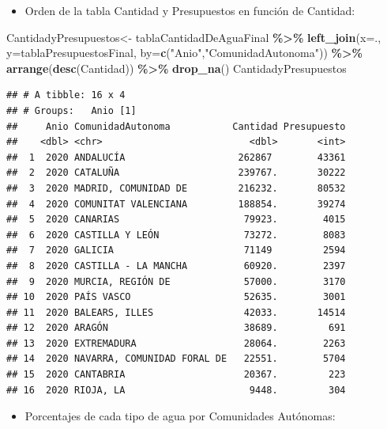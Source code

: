 \documentclass[
]{article}
\newenvironment{Shaded}{\begin{snugshade}}{\end{snugshade}}
\newcommand{\AttributeTok}[1]{\textcolor[rgb]{0.13,0.29,0.53}{#1}}
\newcommand{\FunctionTok}[1]{\textcolor[rgb]{0.13,0.29,0.53}{\textbf{#1}}}
\newcommand{\NormalTok}[1]{#1}
\newcommand{\OtherTok}[1]{\textcolor[rgb]{0.56,0.35,0.01}{#1}}
\newcommand{\SpecialCharTok}[1]{\textcolor[rgb]{0.81,0.36,0.00}{\textbf{#1}}}
\newcommand{\StringTok}[1]{\textcolor[rgb]{0.31,0.60,0.02}{#1}}
\providecommand{\tightlist}{%
  \setlength{\itemsep}{0pt}\setlength{\parskip}{0pt}}
\begin{document}
\hypertarget{CantidadPresupuesto}{}

\begin{itemize}
\tightlist
\item
  Orden de la tabla Cantidad y Presupuestos en función de Cantidad:
\end{itemize}

\begin{Shaded}
\begin{Highlighting}[]
\NormalTok{CantidadyPresupuestos}\OtherTok{\textless{}{-}}\NormalTok{ tablaCantidadDeAguaFinal }\SpecialCharTok{\%\textgreater{}\%} 
  \FunctionTok{left\_join}\NormalTok{(}\AttributeTok{x=}\NormalTok{., }\AttributeTok{y=}\NormalTok{tablaPresupuestosFinal, }\AttributeTok{by=}\FunctionTok{c}\NormalTok{(}\StringTok{"Anio"}\NormalTok{,}\StringTok{"ComunidadAutonoma"}\NormalTok{)) }\SpecialCharTok{\%\textgreater{}\%} 
  \FunctionTok{arrange}\NormalTok{(}\FunctionTok{desc}\NormalTok{(Cantidad)) }\SpecialCharTok{\%\textgreater{}\%} 
  \FunctionTok{drop\_na}\NormalTok{()}
\NormalTok{CantidadyPresupuestos}
\end{Highlighting}
\end{Shaded}

\begin{verbatim}
## # A tibble: 16 x 4
## # Groups:   Anio [1]
##     Anio ComunidadAutonoma           Cantidad Presupuesto
##    <dbl> <chr>                          <dbl>       <int>
##  1  2020 ANDALUCÍA                    262867        43361
##  2  2020 CATALUÑA                     239767.       30222
##  3  2020 MADRID, COMUNIDAD DE         216232.       80532
##  4  2020 COMUNITAT VALENCIANA         188854.       39274
##  5  2020 CANARIAS                      79923.        4015
##  6  2020 CASTILLA Y LEÓN               73272.        8083
##  7  2020 GALICIA                       71149         2594
##  8  2020 CASTILLA - LA MANCHA          60920.        2397
##  9  2020 MURCIA, REGIÓN DE             57000.        3170
## 10  2020 PAÍS VASCO                    52635.        3001
## 11  2020 BALEARS, ILLES                42033.       14514
## 12  2020 ARAGÓN                        38689.         691
## 13  2020 EXTREMADURA                   28064.        2263
## 14  2020 NAVARRA, COMUNIDAD FORAL DE   22551.        5704
## 15  2020 CANTABRIA                     20367.         223
## 16  2020 RIOJA, LA                      9448.         304
\end{verbatim}

\hypertarget{tablaPorcentaje}{}

\begin{itemize}
\tightlist
\item
  Porcentajes de cada tipo de agua por Comunidades Autónomas:
\end{itemize}
\end{document}
